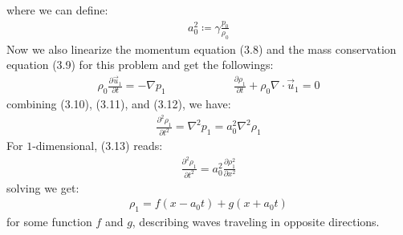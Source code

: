 \documentclass[11pt]{book}
\theoremstyle{break}
\theoremstyle{break}
\begin{document}
where we can define:
\begin{align}
a_0^2 \coloneqq \gamma \frac{p_0}{\rho_0}
\end{align}
Now we also linearize the momentum equation (3.8) and the mass conservation equation (3.9) for this problem and get the followings:
\begin{align}
\rho_0 \frac{\partial \vec{u}_1}{\partial t} = -\nabla p_1 \qquad\qquad\qquad  \frac{\partial \rho_1}{\partial t} + \rho_0 \nabla \cdot \vec{u}_1 = 0
\end{align}
combining (3.10), (3.11), and (3.12), we have:
\begin{align}
\frac{\partial^2 \rho_1}{\partial t^2} = \nabla^2 p_1 = a_0^2 \nabla^2 \rho_1
\end{align}
For $1$-dimensional, (3.13) reads:
\begin{align*}
\frac{\partial^2 \rho_1}{\partial t^2} = a_0^2 \frac{\partial \rho_1^2}{\partial x^2}
\end{align*}
solving we get:
\begin{align*}
\rho_1 = f(x-a_0 t) + g(x+a_0 t)
\end{align*}
for some function $f$ and $g$, describing waves traveling in opposite directions. \\
\end{document}
